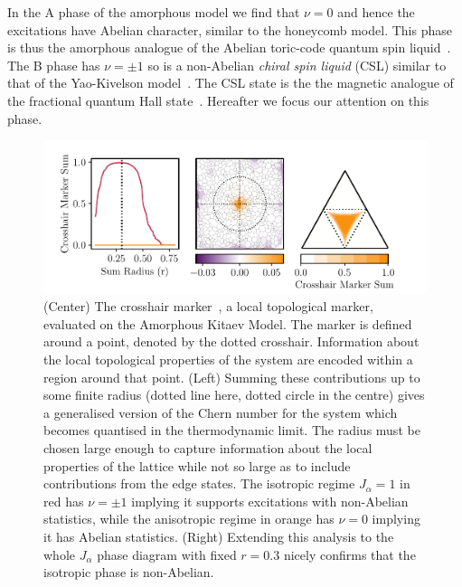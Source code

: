 In the A phase of the amorphous model we find that \(\nu=0\) and hence the excitations have Abelian character, similar to the honeycomb model. This phase is thus the amorphous analogue of the Abelian toric-code quantum spin liquid~\autocite{kitaev_fault-tolerant_2003}. The B phase has \(\nu=\pm1\) so is a non-Abelian \emph{chiral spin liquid} (CSL) similar to that of the Yao-Kivelson model~\autocite{yaoExactChiralSpin2007}. The CSL state is the the magnetic analogue of the fractional quantum Hall state~\autocite{laughlinPropertiesChiralspinliquidState1990}. Hereafter we focus our attention on this phase.

\hypertarget{fig:phase_diagram_chern}{%
\begin{figure}
\centering
\includegraphics[width=1\textwidth,height=\textheight]{figure_code/amk_chapter/results/phase_diagram_chern/phase_diagram_chern}
\caption[{Local Chern Markers}]{(Center) The crosshair marker~\autocite{peru_preprint}, a local topological marker, evaluated on the Amorphous Kitaev Model. The marker is defined around a point, denoted by the dotted crosshair. Information about the local topological properties of the system are encoded within a region around that point. (Left) Summing these contributions up to some finite radius (dotted line here, dotted circle in the centre) gives a generalised version of the Chern number for the system which becomes quantised in the thermodynamic limit. The radius must be chosen large enough to capture information about the local properties of the lattice while not so large as to include contributions from the edge states. The isotropic regime \(J_\alpha = 1\) in red has \(\nu = \pm 1\) implying it supports excitations with non-Abelian statistics, while the anisotropic regime in orange has \(\nu = 0\) implying it has Abelian statistics. (Right) Extending this analysis to the whole \(J_\alpha\) phase diagram with fixed \(r = 0.3\) nicely confirms that the isotropic phase is non-Abelian.}
\label{fig:phase_diagram_chern}
\end{figure}
}

